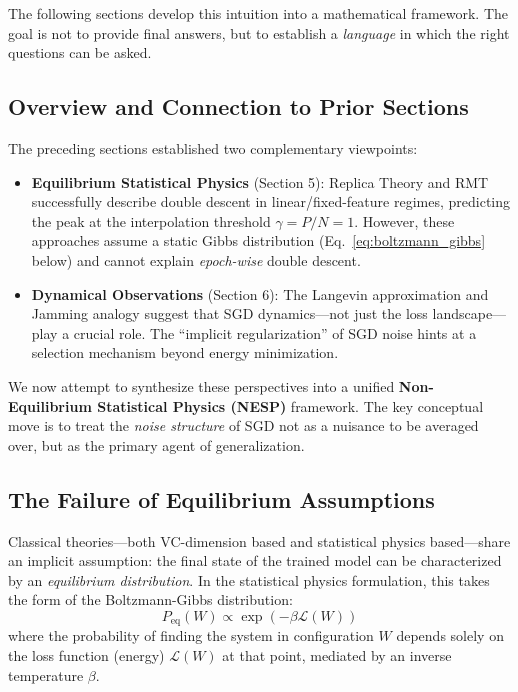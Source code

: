 \documentclass[
  journal=largetwo,
  year=2025,
  volume=37,
]{cup-journal}
\begin{document}
The following sections develop this intuition into a mathematical framework. The goal is not to provide final answers, but to establish a \textit{language} in which the right questions can be asked.

\subsection{Overview and Connection to Prior Sections}

The preceding sections established two complementary viewpoints: 
\begin{itemize}
    \item \textbf{Equilibrium Statistical Physics} (Section 5): Replica Theory and RMT successfully describe double descent in linear/fixed-feature regimes, predicting the peak at the interpolation threshold $\gamma = P/N = 1$. However, these approaches assume a static Gibbs distribution (Eq.~\eqref{eq:boltzmann_gibbs} below) and cannot explain \textit{epoch-wise} double descent.
    \item \textbf{Dynamical Observations} (Section 6): The Langevin approximation and Jamming analogy suggest that SGD dynamics---not just the loss landscape---play a crucial role. The ``implicit regularization'' of SGD noise hints at a selection mechanism beyond energy minimization.
\end{itemize}

We now attempt to synthesize these perspectives into a unified \textbf{Non-Equilibrium Statistical Physics (NESP)} framework. The key conceptual move is to treat the \textit{noise structure} of SGD not as a nuisance to be averaged over, but as the primary agent of generalization.

\subsection{The Failure of Equilibrium Assumptions}

Classical theories---both VC-dimension based and statistical physics based---share an implicit assumption: the final state of the trained model can be characterized by an \textit{equilibrium distribution}. In the statistical physics formulation, this takes the form of the Boltzmann-Gibbs distribution:
\begin{equation}\label{eq:boltzmann_gibbs}
    P_{\text{eq}}(W) \propto \exp\left(-\beta \mathcal{L}(W)\right)
\end{equation}
where the probability of finding the system in configuration $W$ depends solely on the loss function (energy) $\mathcal{L}(W)$ at that point, mediated by an inverse temperature $\beta$.
\end{document}
